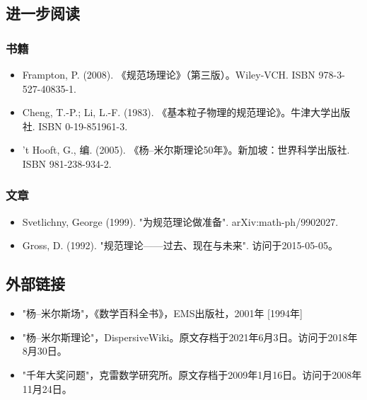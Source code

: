 \subsection{进一步阅读}
\subsubsection{书籍} 
\begin{itemize}
\item Frampton, P. (2008). 《规范场理论》（第三版）。Wiley-VCH. ISBN 978-3-527-40835-1.  
\item Cheng, T.-P.; Li, L.-F. (1983). 《基本粒子物理的规范理论》。牛津大学出版社. ISBN 0-19-851961-3.  
\item 't Hooft, G., 编. (2005). 《杨–米尔斯理论50年》。新加坡：世界科学出版社. ISBN 981-238-934-2.
\end{itemize}
\subsubsection{文章} 
\begin{itemize}
\item Svetlichny, George (1999). "为规范理论做准备". arXiv:math-ph/9902027.  
\item Gross, D. (1992). "规范理论——过去、现在与未来". 访问于2015-05-05。
\end{itemize}
\subsection{外部链接}
\begin{itemize}
\item "杨–米尔斯场"，《数学百科全书》，EMS出版社，2001年 [1994年]  
\item "杨–米尔斯理论"，DispersiveWiki。原文存档于2021年6月3日。访问于2018年8月30日。  
\item "千年大奖问题"，克雷数学研究所。原文存档于2009年1月16日。访问于2008年11月24日。
\end{itemize}
